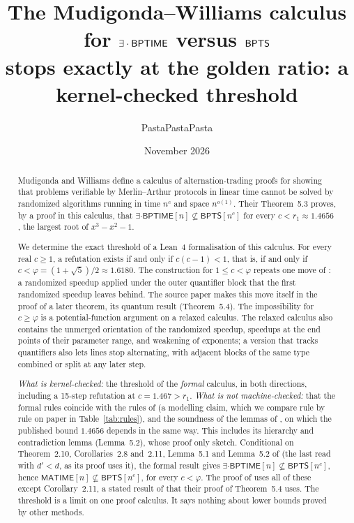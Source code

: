 \documentclass[11pt]{article}
\title{The Mudigonda--Williams calculus for $\exists\cdot\BPTIME$ versus $\BPTS$\\ stops exactly at the golden ratio: a kernel-checked threshold}
\author{PastaPastaPasta}
\date{November 2026}
\theoremstyle{definition}
\newcommand{\BPTS}{\mathsf{BPTS}}
\newcommand{\BPTIME}{\mathsf{BPTIME}}
\newcommand{\MATIME}{\mathsf{MATIME}}
\begin{document}
\maketitle

\begin{abstract}
Mudigonda and Williams \cite{MW21} define a calculus of alternation-trading proofs for showing that problems verifiable by Merlin--Arthur protocols in linear time cannot be solved by randomized algorithms running in time $n^c$ and space $n^{o(1)}$. Their Theorem~5.3 proves, by a proof in this calculus, that $\exists\cdot\BPTIME[n]\not\subseteq\BPTS[n^c]$ for every $c<r_1\approx1.4656$, the largest root of $x^3-x^2-1$.

We determine the exact threshold of a Lean~4 formalisation of this calculus. For every real $c\ge1$, a refutation exists if and only if $c(c-1)<1$, that is, if and only if $c<\varphi=(1+\sqrt5)/2\approx1.6180$. The construction for $1\le c<\varphi$ repeats one move of \cite{MW21}: a randomized speedup applied under the outer quantifier block that the first randomized speedup leaves behind. The source paper makes this move itself in the proof of a later theorem, its quantum result (Theorem~5.4). The impossibility for $c\ge\varphi$ is a potential-function argument on a relaxed calculus. The relaxed calculus also contains the unmerged orientation of the randomized speedup, speedups at the end points of their parameter range, and weakening of exponents; a version that tracks quantifiers also lets lines stop alternating, with adjacent blocks of the same type combined or split at any later step.

\emph{What is kernel-checked:} the threshold of the \emph{formal} calculus, in both directions, including a 15-step refutation at $c=1.467>r_1$.
\emph{What is not machine-checked:} that the formal rules coincide with the rules of \cite{MW21} (a modelling claim, which we compare rule by rule on paper in Table~\ref{tab:rules}), and the soundness of the lemmas of \cite{MW21}, on which the published bound $1.4656$ depends in the same way. This includes its hierarchy and contradiction lemma (Lemma~5.2), whose proof \cite{MW21} only sketch. Conditional on Theorem~2.10, Corollaries~2.8 and~2.11, Lemma~5.1 and Lemma~5.2 of \cite{MW21} (the last read with $d'<d$, as its proof uses it), the formal result gives $\exists\cdot\BPTIME[n]\not\subseteq\BPTS[n^c]$, hence $\MATIME[n]\not\subseteq\BPTS[n^c]$, for every $c<\varphi$. The proof of \cite[Theorem~5.3]{MW21} uses all of these except Corollary~2.11, a stated result of \cite{MW21} that their proof of Theorem~5.4 uses. The threshold is a limit on one proof calculus. It says nothing about lower bounds proved by other methods.
\end{abstract}
\end{document}
